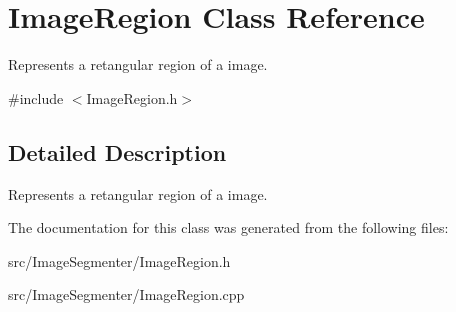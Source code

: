 \hypertarget{class_image_region}{}\section{Image\+Region Class Reference}
\label{class_image_region}


Represents a retangular region of a image.  




{\ttfamily \#include $<$Image\+Region.\+h$>$}



\subsection{Detailed Description}
Represents a retangular region of a image. 

The documentation for this class was generated from the following files\+:\begin{DoxyCompactItemize}
\item 
src/\+Image\+Segmenter/Image\+Region.\+h\item 
src/\+Image\+Segmenter/Image\+Region.\+cpp\end{DoxyCompactItemize}
